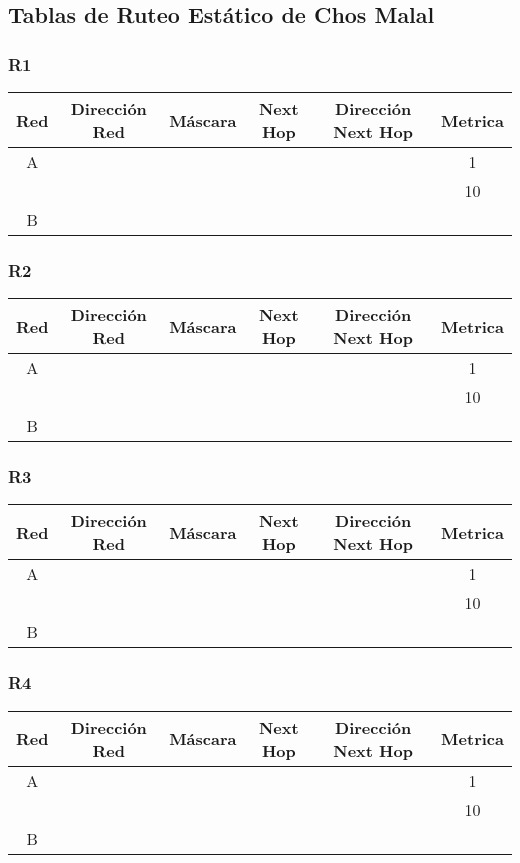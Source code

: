 \documentclass[12pt,a4paper,spanish]{article}
\begin{document}
\subsection{Tablas de Ruteo Estático de Chos Malal}
\subsubsection{R1}
\begin{tabular}{|c|c|c|c|c|c|}
	\hline
	Red & Dirección Red & Máscara & Next Hop & Dirección Next Hop & Metrica \\
	\hline
	\hline
	A &  &  &  &  & 1\\ %
 	  &  &  &  &  & 10 \\ %
	\hline	
	B & & & & &\\
	\hline
\end{tabular}

\subsubsection{R2}
\begin{tabular}{|c|c|c|c|c|c|}
	\hline
	Red & Dirección Red & Máscara & Next Hop & Dirección Next Hop & Metrica \\
	\hline
	\hline
	A &  &  &  &  & 1\\
 	  &  &  &  &  & 10 \\
	\hline	
	B & & & & &\\
	\hline
\end{tabular}


\subsubsection{R3}
\begin{tabular}{|c|c|c|c|c|c|}
	\hline
	Red & Dirección Red & Máscara & Next Hop & Dirección Next Hop & Metrica \\
	\hline
	\hline
	A &  &  &  &  & 1\\
 	  &  &  &  &  & 10 \\
	\hline	
	B & & & & &\\
	\hline
\end{tabular}

\subsubsection{R4}
\begin{tabular}{|c|c|c|c|c|c|}
	\hline
	Red & Dirección Red & Máscara & Next Hop & Dirección Next Hop & Metrica \\
	\hline
	\hline
	A &  &  &  &  & 1\\
 	  &  &  &  &  & 10 \\
	\hline	
	B & & & & &\\
	\hline
\end{tabular}
\end{document}

